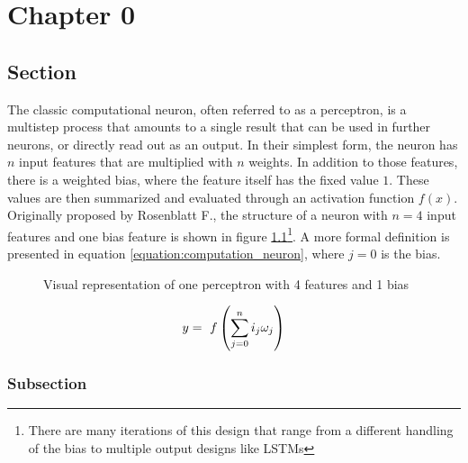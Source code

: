 \chapter{Chapter 0} %

\label{chapter:0} %



\section{Section}
The classic computational neuron, often referred to as a perceptron, is a multistep process that amounts to a single result that can be used in further neurons, or directly read out as an output. In their simplest form, the neuron has $n$ input features that are multiplied with $n$ weights. In addition to those features, there is a weighted bias, where the feature itself has the fixed value $1$. These values are then summarized and evaluated through an activation function $f(x)$. Originally proposed by Rosenblatt F.\cite{rosenblatt_perceptron_1958}, the structure of a neuron with $n = 4$ input features and one bias feature is shown in figure \ref{figure:computation_neuron}\footnote{There are many iterations of this design that range from a different handling of the bias to multiple output designs like LSTMs\cite{lstm}}. A more formal definition is presented in equation \ref{equation:computation_neuron}, where $j=0$ is the bias.

\begin{figure}[h!]
    \centering
    \caption{Visual representation of one perceptron with 4 features and 1 bias}
    \label{figure:computation_neuron}
\end{figure}

\begin{equation}
    \centering
    y =\ f\left(\sum_{j = 0}^n i_j\omega_j\right)
    \label{equation:computation_neuron}
\end{equation}

\subsection{Subsection}

\newpage
